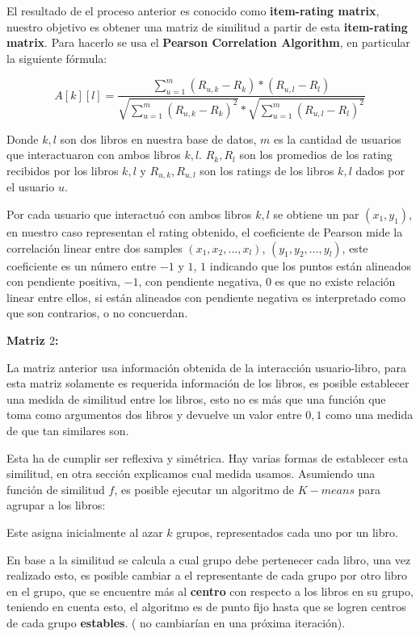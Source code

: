 \documentclass[14pt]{extarticle}
\begin{document}
El resultado de el proceso anterior es conocido como \textbf{item-rating matrix}, nuestro objetivo es obtener una matriz de similitud a partir de esta \textbf{item-rating matrix}. Para hacerlo se usa el \textbf{Pearson Correlation Algorithm}, en particular la siguiente fórmula:

$$A[k][l] = \frac{ \sum_{u = 1}^m (R_{u,k} - R_k)*(R_{u,l} - R_l) }{ \sqrt{\sum_{u = 1}^m (R_{u,k} - R_k)^2} * \sqrt{\sum_{u = 1}^m (R_{u,l} - R_l)^2} }$$

Donde $k, l$ son dos libros en nuestra base de datos, $m$ es la cantidad de usuarios que interactuaron con ambos libros $k, l$. $R_k,R_l$ son los promedios de los rating recibidos por los libros $k, l$ y $R_{u,k}, R_{u,l}$ son los ratings de los libros $k, l$ dados por el usuario $u$. 

Por cada usuario que interactuó con ambos libros $k,l$ se obtiene un par $(x_1, y_1)$, en nuestro caso representan el rating obtenido, el coeficiente de Pearson mide la correlación linear entre dos samples $(x_1, x_2, ..., x_l)$, $(y_1, y_2, ..., y_l)$, este coeficiente es un número entre $-1$ y $1$, $1$ indicando que los puntos están alineados con pendiente positiva, $-1$, con pendiente negativa, $0$ es que no existe relación linear entre ellos, si están alineados con pendiente negativa es interpretado como que son contrarios, o no concuerdan.

\textbf{Matriz $2$:}

La matriz anterior usa información obtenida de la interacción usuario-libro, para esta matriz solamente es requerida información de los libros, es posible establecer una medida de similitud entre los libros, esto no es más que una función que toma como argumentos dos libros y devuelve un valor entre $0, 1$ como una medida de que tan similares son. 

Esta ha de cumplir ser reflexiva y simétrica. Hay varias formas de establecer esta similitud, en otra sección explicamos cual medida usamos. Asumiendo una función de similitud $f$, es posible ejecutar un algoritmo de $K-means$ para agrupar a los libros:

Este asigna inicialmente al azar $k$ grupos, representados cada uno por un libro.

En base a la similitud se calcula a cual grupo debe pertenecer cada libro, una vez realizado esto, es posible cambiar a el representante de cada grupo por otro libro en el grupo, que se encuentre más al \textbf{centro} con respecto a los libros en su grupo, teniendo en cuenta esto, el algoritmo es de punto fijo hasta que se logren centros de cada grupo \textbf{estables}. ( no cambiarían en una próxima iteración). 
\end{document}
